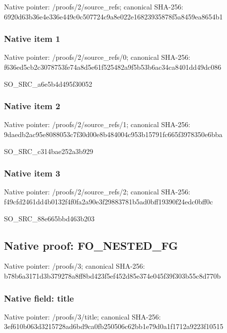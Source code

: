\documentclass[10pt,a4paper]{article}
\begin{document}
Native pointer: /proofs/2/source\_refs; canonical SHA-256: 6920d63b36e4e336e449c0c5\allowbreak{}07724c9a8e022e1682393587\allowbreak{}8f5a8459ea8654b1



\subsubsection{Native item 1}


Native pointer: /proofs/2/source\_refs/0; canonical SHA-256: f636ed5cb2c3078753fe74a8\allowbreak{}d5e61f525482a9f5b53b6ac3\allowbreak{}4ca8401dd49dc086


SO\_SRC\_a6e5b4d495f30052


\subsubsection{Native item 2}


Native pointer: /proofs/2/source\_refs/1; canonical SHA-256: 9daedb2ac95e8088053c7f30\allowbreak{}d00e8b484004c953b15791fc\allowbreak{}665f3978350e6bba


SO\_SRC\_c314bae252a3b929


\subsubsection{Native item 3}


Native pointer: /proofs/2/source\_refs/2; canonical SHA-256: f49cfd2461dd4b0132f4f0fa\allowbreak{}2a90e3f29883781b5ad0bff1\allowbreak{}9390f24edc0bff0c


SO\_SRC\_88e665bbd463b203


\subsection{Native proof: FO\_NESTED\_FG}


Native pointer: /proofs/3; canonical SHA-256: b78b6a3171d3b379278a8ff8\allowbreak{}bd423f5ef452d85e374e045f\allowbreak{}39f303b55c8d770b



\subsubsection{Native field: title}


Native pointer: /proofs/3/title; canonical SHA-256: 3ef610b063d3215728ad6bd9\allowbreak{}ca0fb250506c62bb1e79d0a1\allowbreak{}f1712a9223f10515
\end{document}
